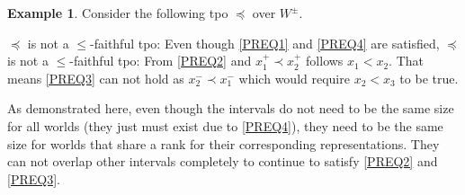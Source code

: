 \documentclass[english, 12pt]{scrartcl}
\theoremstyle{definition}
\newtheorem{example}{Example}
\theoremstyle{definition}
\theoremstyle{definition}
\begin{document}
\begin{example}
    \label{example:example-faithful-tpo}
    Consider the following tpo $\preceq$ over $W^{\pm}$.
        
    \begin{figure}[H]
        \centering
    \end{figure}
    
    $\preceq$ is not a $\leq$-faithful tpo: Even though \ref{PREQ1} and \ref{PREQ4} are satisfied, $\preceq$ is not a $\leq$-faithful tpo: From \ref{PREQ2} and $x_{1}^{+} \prec x_{2}^{+}$ follows $x_{1} < x_{2}$. That means \ref{PREQ3} can not hold as $x_{2}^{-} \prec x_{1}^{-}$ which would require $x_{2} < x_{3}$ to be true.
    
    As demonstrated here, even though the intervals do not need to be the same size for all worlds (they just must exist due to \ref{PREQ4}), they need to be the same size for worlds that share a rank for their corresponding representations. They can not overlap other intervals completely to continue to satisfy \ref{PREQ2} and \ref{PREQ3}.
\end{example}
\end{document}
